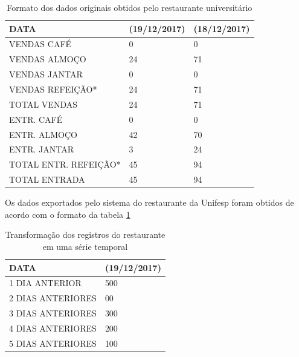 \documentclass[	12pt, Times, openright, twoside, a4paper, english, brazil]{abntex2}
\begin{document}
        	\begin{table}[!ht]
        	    \centering
                \begin{tabular}{|l|l|l|}
                    \hline
                    DATA                  & (19/12/2017) & (18/12/2017) \\ \hline
                    VENDAS CAFÉ           & 0            & 0            \\
                    VENDAS ALMOÇO         & 24           & 71           \\
                    VENDAS JANTAR         & 0            & 0            \\
                    VENDAS REFEIÇÃO*      & 24           & 71           \\
                    TOTAL VENDAS          & 24           & 71           \\
                    ENTR. CAFÉ            & 0            & 0            \\
                    ENTR. ALMOÇO          & 42           & 70           \\
                    ENTR. JANTAR          & 3            & 24           \\
                    TOTAL ENTR. REFEIÇÃO* & 45           & 94           \\
                    TOTAL ENTRADA         & 45           & 94           \\ \hline
                \end{tabular}
                \caption{Formato dos dados originais obtidos pelo restaurante universitário}
                \label{table:dadosrestaurante}
            \end{table}
            Os dados exportados pelo sistema do restaurante da Unifesp foram obtidos de acordo com o formato da tabela \ref{table:dadosrestaurante}\\
            
            \begin{table}[!ht]
                \centering
                \begin{tabular}{|l|l|}
                \hline
                    DATA                  & (19/12/2017) \\ \hline
                1 DIA ANTERIOR    & 500        \\
                2 DIAS ANTERIORES & 00                            \\
                3 DIAS ANTERIORES & 300                            \\
                4 DIAS ANTERIORES & 200                            \\
                5 DIAS ANTERIORES & 100                          \\ \hline 
                \end{tabular}
                \caption{Transformação dos registros do restaurante em uma série temporal}
                \label{table:transformacaodadosrestaurante}
            \end{table}
            
\end{document}
